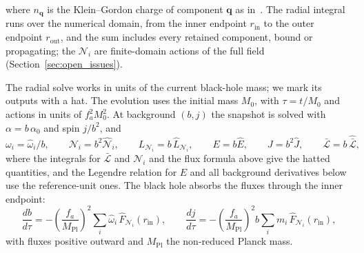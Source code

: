 where $n_\mathbf{q}$ is the Klein--Gordon charge of component $\mathbf{q}$ as in~\cite{Hayes_1970}. The radial integral runs over the numerical domain, from the inner endpoint $r_\mathrm{in}$ to the outer endpoint $r_\mathrm{out}$, and the sum includes every retained component, bound or propagating; the $\mathcal{N}_i$ are finite-domain actions of the full field (Section~\ref{sec:open_issues}).



The radial solve works in units of the current black-hole mass; we mark its outputs with a hat. The evolution uses the initial mass $M_0$, with $\tau=t/M_0$ and actions in units of $f_a^2M_0^2$. At background $(b,j)$ the snapshot is solved with $\alpha=b\,\alpha_0$ and spin $j/b^2$, and
\begin{equation}
    \label{eq:reference_units}
    \omega_i = \hat\omega_i/b, \qquad
    \mathcal{N}_i = b^2\hat{\mathcal{N}}_i, \qquad
    L_{\mathcal{N}_i} = b\,\hat L_{\mathcal{N}_i}, \qquad
    E = b\hat E, \qquad
    J = b^2\hat J, \qquad
    \bar{\mathcal L} = b\,\hat{\bar{\mathcal L}},
\end{equation}
where the integrals for $\bar{\mathcal L}$ and $\mathcal N_i$ and the flux formula above give the hatted quantities, and the Legendre relation for $E$ and all background derivatives below use the reference-unit ones. The black hole absorbs the fluxes through the inner endpoint:
\begin{equation}
    \label{eq:black_hole_evolution}
    \frac{db}{d\tau} = -\left(\frac{f_a}{M_\mathrm{Pl}}\right)^{2}\sum_i\hat\omega_i\,\hat F_{\mathcal{N}_i}(r_\mathrm{in}),
    \qquad
    \frac{dj}{d\tau} = -\left(\frac{f_a}{M_\mathrm{Pl}}\right)^{2} b\sum_i m_i\,\hat F_{\mathcal{N}_i}(r_\mathrm{in}),
\end{equation}
with fluxes positive outward and $M_\mathrm{Pl}$ the non-reduced Planck mass.


